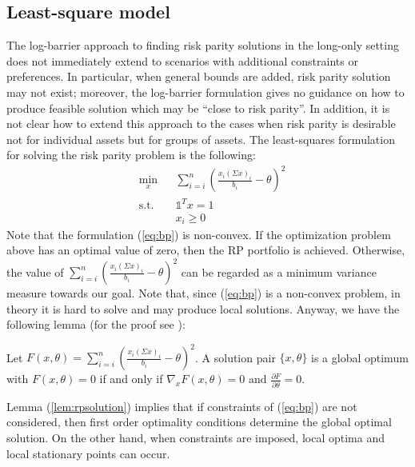 \subsection{Least-square model}
The log-barrier approach to finding risk parity solutions in the long-only setting does not immediately extend to scenarios with additional constraints or preferences. In particular, when general bounds are added, risk parity solution may not exist; moreover, the log-barrier formulation gives no guidance on how to produce feasible solution which may be “close to risk parity”. In addition, it is not clear how to extend this approach to the cases when risk parity is desirable not for individual assets but for groups of assets. The least-squares formulation for solving the risk parity problem is the following:
\begin{equation}\label{eq:bp}
\begin{aligned}
& \min_x
&& \sum_{i=i}^n \left( \frac{x_i(\Sigma x)_i}{b_i} - \theta \right)^2\\
& \text{s.t.}
&&\mathds{1}^T x =1\\
&&&x_i \geq 0
\end{aligned}
\end{equation}
Note that the formulation (\ref{eq:bp}) is non-convex.  If the optimization problem above has an optimal value of zero, then the RP portfolio is achieved. Otherwise, the value of $\sum_{i=i}^n \left( \frac{x_i(\Sigma x)_i}{b_i} - \theta\right)^2$  can be regarded as a minimum variance measure towards our goal. Note that, since (\ref{eq:bp}) is a non-convex problem, in theory it is hard to solve and may produce local solutions. Anyway, we have the following lemma (for the proof see \cite{tutuncu}):
\begin{lemma}\label{lem:rpsolution}
Let $F(x,\theta) = \sum_{i=i}^n \left( \frac{x_i(\Sigma x)_i}{b_i} - \theta \right)^2$. A solution pair $\{x,\theta\}$ is a global optimum with $F(x,\theta)=0$ if and only if $\nabla_xF(x,\theta) = 0$ and $\frac{\partial F}{\partial \theta} = 0$.
\end{lemma}
Lemma (\ref{lem:rpsolution}) implies that if constraints of (\ref{eq:bp}) are not considered, then first order optimality conditions determine the global optimal solution. On the other hand, when constraints are imposed, local optima and local stationary points can occur.
